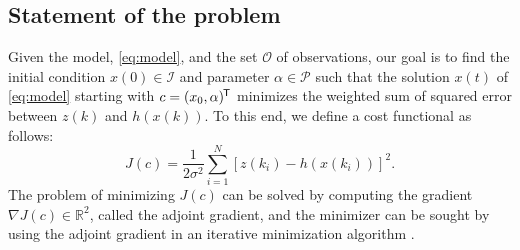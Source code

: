 \documentclass{article}
\newcommand*{\tran}{^{\mkern-1.5mu\mathsf{T}}}
\begin{document}
\subsection{Statement of the problem} \label{sec:prob}
Given the model, \cref{eq:model}, and the set $\mathcal{O}$ of observations, our goal is to find the initial condition $x(0) \in \mathcal{I}$ and parameter $\alpha \in \mathcal{P}$ such that the solution $x(t)$ of \cref{eq:model} starting with $c = (x_0, \alpha)\tran$ minimizes the weighted sum of squared error between $z(k)$ and $h(x(k))$. To this end, we define a cost functional as follows:
\begin{equation}
    J(c) = \dfrac{1}{2\sigma^2} \sum_{i=1}^{N} [z(k_i) - h(x(k_i))]^2.
\end{equation}
The problem of minimizing $J(c)$ can be solved by computing the gradient $\nabla J(c) \in \mathbb{R}^2$, called the adjoint gradient, and the minimizer can be sought by using the adjoint gradient in an iterative minimization algorithm \cite{lewis2006dynamic}.


\end{document}
